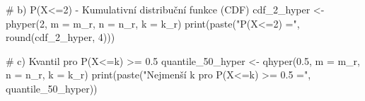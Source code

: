 \documentclass[
  czech,
  11pt,
  letterpaper,
  DIV=11,
  numbers=noendperiod]{scrreprt}
\newenvironment{Shaded}{\begin{snugshade}}{\end{snugshade}}
\newcommand{\AttributeTok}[1]{\textcolor[rgb]{0.40,0.45,0.13}{#1}}
\newcommand{\CommentTok}[1]{\textcolor[rgb]{0.37,0.37,0.37}{#1}}
\newcommand{\DecValTok}[1]{\textcolor[rgb]{0.68,0.00,0.00}{#1}}
\newcommand{\FloatTok}[1]{\textcolor[rgb]{0.68,0.00,0.00}{#1}}
\newcommand{\FunctionTok}[1]{\textcolor[rgb]{0.28,0.35,0.67}{#1}}
\newcommand{\NormalTok}[1]{\textcolor[rgb]{0.00,0.23,0.31}{#1}}
\newcommand{\OtherTok}[1]{\textcolor[rgb]{0.00,0.23,0.31}{#1}}
\newcommand{\StringTok}[1]{\textcolor[rgb]{0.13,0.47,0.30}{#1}}
\begin{document}
\begin{tcolorbox}
\begin{Shaded}
\begin{Highlighting}[]
\CommentTok{\# b) P(X\textless{}=2) {-} Kumulativní distribuční funkce (CDF)}
\NormalTok{cdf\_2\_hyper }\OtherTok{\textless{}{-}} \FunctionTok{phyper}\NormalTok{(}\DecValTok{2}\NormalTok{, }\AttributeTok{m =}\NormalTok{ m\_r, }\AttributeTok{n =}\NormalTok{ n\_r, }\AttributeTok{k =}\NormalTok{ k\_r)}
\FunctionTok{print}\NormalTok{(}\FunctionTok{paste}\NormalTok{(}\StringTok{"P(X\textless{}=2) ="}\NormalTok{, }\FunctionTok{round}\NormalTok{(cdf\_2\_hyper, }\DecValTok{4}\NormalTok{)))}

\CommentTok{\# c) Kvantil pro P(X\textless{}=k) \textgreater{}= 0.5}
\NormalTok{quantile\_50\_hyper }\OtherTok{\textless{}{-}} \FunctionTok{qhyper}\NormalTok{(}\FloatTok{0.5}\NormalTok{, }\AttributeTok{m =}\NormalTok{ m\_r, }\AttributeTok{n =}\NormalTok{ n\_r, }\AttributeTok{k =}\NormalTok{ k\_r)}
\FunctionTok{print}\NormalTok{(}\FunctionTok{paste}\NormalTok{(}\StringTok{"Nejmenší k pro P(X\textless{}=k) \textgreater{}= 0.5 ="}\NormalTok{, quantile\_50\_hyper))}
\end{Highlighting}
\end{Shaded}

\end{tcolorbox}
\end{document}
